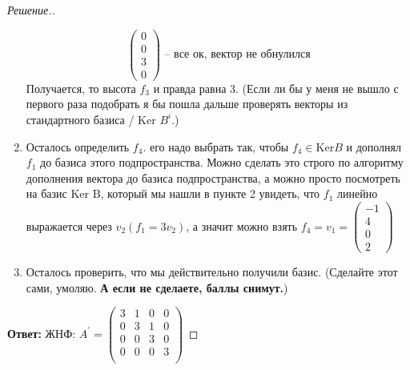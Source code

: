 \documentclass[a4paper]{article}
\theoremstyle{remark}
\begin{document}
\begin{proof}[Решение.]
\begin{enumerate}
$$\begin{pmatrix}
                    0\\
                    0\\
                    3\\
                    0
                \end{pmatrix}
                \text{  -- все ок, вектор не обнулился}
                $$ 
                Получается, то высота $f_3$ и правда равна 3. (Если 
                ли бы у меня не вышло с первого раза подобрать я бы пошла 
                дальше проверять векторы из стандартного базиса / Ker $B^i$.)
                \item Осталось определить $f_4$. его надо выбрать так, чтобы $f_4 \in \text{Ker} B$ 
                и дополнял $f_1$ до базиса этого подпространства. 
                Можно сделать это строго по алгоритму дополнения вектора до базиса подпространства, 
                а можно просто посмотреть на базис Ker B, который мы нашли в пункте 2 увидеть, что 
                $f_1$ линейно выражается через $v_2 (f_1= 3v_2)$, а значит можно взять $f_4 = v_1 = 
                \begin{pmatrix}
                    -1\\
                    4\\
                    0\\
                    2
                \end{pmatrix}$
                \item Осталось проверить, что мы действительно получили базис. 
                (Сделайте этот сами, умоляю. \textbf{А если не сделаете, баллы снимут.})
            \end{enumerate}

            \textbf{Ответ:} ЖНФ: $A^\prime = 
            \begin{pmatrix}
                3 & 1 & 0 & 0 \\
                0 & 3 & 1 & 0 \\
                0 & 0 & 3 & 0 \\
                0 & 0 & 0 & 3 \\
            \end{pmatrix}$


\end{proof}
\end{document}
